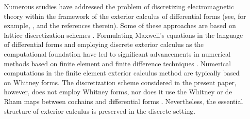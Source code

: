 \documentclass[english]{article}
\theoremstyle{plain}
\theoremstyle{definition}
\theoremstyle{remark}
\numberwithin{equation}{section}
\begin{document}
Numerous studies have addressed the problem of discretizing electromagnetic theory within the framework of the exterior calculus of differential forms (see, for example, \cite{AK, Bossavit1, Bossavit, ChCh, Christiansen, Hiptmair, Monk, Teixeira1, Teixeira}, and the references therein). Some of these approaches are based on lattice discretization schemes \cite{ChCh,Teixeira1, Teixeira}. Formulating Maxwell’s equations in the language of differential forms \cite{Deschamps} and employing discrete exterior calculus as the computational foundation have led to significant advancements in numerical methods based on finite element and finite difference techniques \cite{ACHZ, AK, Berchenko, Bossavit1, Bossavit, Kim, Monk}.  Numerical computations in the finite element exterior calculus method \cite{Arnold} are typically based on Whitney forms. The discretization scheme considered in the present paper, however, does not employ Whitney forms, nor does it use the Whitney or de Rham maps between cochains and differential forms \cite{Teixeira}. Nevertheless, the essential structure of exterior calculus is preserved in the discrete setting.
\end{document}

